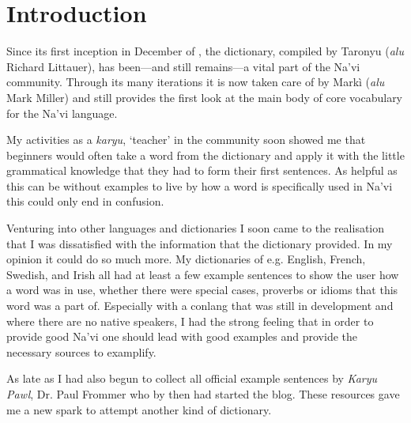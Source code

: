 \section*{Introduction}


Since its first inception in December of , the  dictionary, compiled by Taronyu (\emph{alu} Richard Littauer), has been---and still remains---a vital part of the Na'vi community. Through its many iterations it is now taken care of by Markì (\emph{alu} Mark Miller) and still provides the first look at the main body of core vocabulary for the Na'vi language.

My activities as a \emph{karyu}, `teacher' in the community soon showed me that beginners would often take a word from the dictionary and apply it with the little grammatical knowledge that they had to form their first sentences. As helpful as this can be without examples to live by how a word is specifically used in Na'vi this could only end in confusion. 

Venturing into other languages and dictionaries I soon came to the realisation that I was dissatisfied with the information that the dictionary provided. In my opinion it could do so much more. My dictionaries of e.g. English, French, Swedish, and Irish all had at least a few example sentences to show the user how a word was in use, whether there were special cases, proverbs or idioms that this word was a part of. Especially with a conlang that was still in development and where there are no native speakers, I had the strong feeling that in order to provide good Na'vi one should lead with good examples and provide the necessary sources to examplify.

As late as  I had also begun to collect all official example sentences by \emph{Karyu Pawl}, Dr. Paul Frommer who by then had started the  blog. These resources gave me a new spark to attempt another kind of dictionary.




